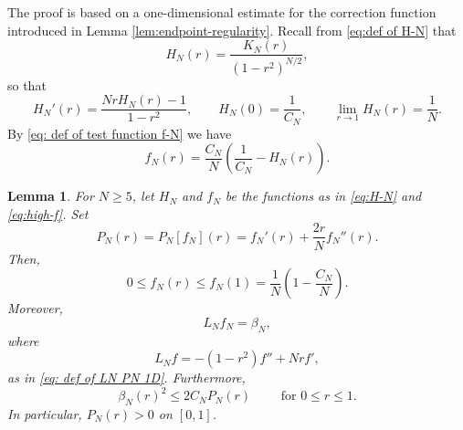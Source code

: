 \documentclass[11pt,letterpaper]{amsart}
\newtheorem{lemma}[theorem]{Lemma}
\theoremstyle{definition}
\theoremstyle{remark}
\numberwithin{equation}{section}
\begin{document}
The proof is based on a one-dimensional estimate for the correction function introduced in Lemma \ref{lem:endpoint-regularity}. Recall from \eqref{eq:def of H-N} that
\begin{equation}\label{eq:H-N}
 H_N(r)=\frac{K_N(r)}{(1-r^2)^{N/2}},
\end{equation}
so that
\begin{equation}\label{eq:H-ODE}
 H_N'(r)=\frac{NrH_N(r)-1}{1-r^2},
 \qquad
 H_N(0)=\frac1{C_N},
 \qquad
 \lim_{r\to1}H_N(r)=\frac1N.
\end{equation}
By \eqref{eq: def of test function f-N} we have
\begin{equation}\label{eq:high-f}
 f_N(r)=\frac{C_N}{N}\left(\frac1{C_N}-H_N(r)\right).
\end{equation}
\begin{lemma}\label{lem:high-1D}
For $N\ge5$, let $H_N$ and $f_N$ be the functions as in \eqref{eq:H-N} and \eqref{eq:high-f}. Set
\begin{equation}\label{eq:calP-def}
 P_N(r)=P_N\left[f_N\right](r)=f_N'(r)+\frac{2r}{N}f_N''(r).
\end{equation}
Then,
\begin{equation}\label{eq:high-f-bounds}
 0\le f_N(r)\le f_N(1)=\frac1N\left(1-\frac{C_N}{N}\right).
\end{equation}
Moreover, 
\begin{equation}\label{eq:high-Lf}
 L_Nf_N=\beta_N,
\end{equation}
where 
\[
 L_Nf=-(1-r^2)f''+Nrf',
\]
as in \eqref{eq: def of LN PN 1D}.
Furthermore, 
\begin{equation}\label{eq:high-pointwise}
\beta_N(r)^2\le2C_NP_N(r)\qquad \text{ for } 0\le r\le1.
\end{equation}
In particular, $P_N(r)>0$ on $[0,1]$.
\end{lemma}
\end{document}
